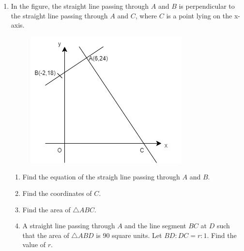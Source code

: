 \documentclass[11pt]{article}
\begin{document}
\begin{enumerate}
            \hrulefill
            
            \hrulefill
            
            \hrulefill
            
            \hrulefill

        \pagebreak
        \item In the figure, the straight line passing through $A$ and $B$ is perpendicular to the straight line passing through $A$ and $C$, where $C$ is a point lying on the x-axis.\begin{figure}[H]
            \centering
            \includegraphics[scale=0.6]{f4finalq5.png}
        \end{figure}\begin{enumerate}
            \item Find the equation of the straigh line passing through $A$ and $B$.
            \item Find the coordinates of $C$.
            \item Find the area of $\triangle ABC$.
            \item A straight line passing through $A$ and the line segment $BC$ at $D$ such that the area of $\triangle ABD$ is 90 square units. Let $BD:DC=r:1$. Find the value of $r$.
        \end{enumerate}
        \hrulefill
                    
            \hrulefill

            \hrulefill
            
            \hrulefill
        
            \hrulefill
            
            \hrulefill
                
            \hrulefill
            
            \hrulefill
                

\end{enumerate}
\end{document}
